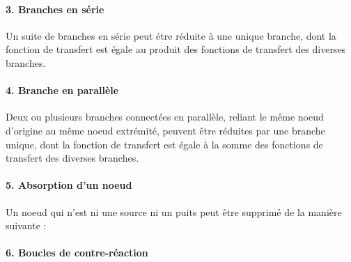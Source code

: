 \paragraph{3. Branches en série}
Un suite de branches en série peut étre réduite à une unique branche, dont la 
fonction de transfert est égale au produit des fonctions de transfert des 
diverses branches.

\begin{center}
    
\end{center}


\paragraph{4. Branche en parallèle}
Deux ou plusieurs branches connectées en parallèle, reliant le même noeud 
d'origine au même noeud extrémité, peuvent être réduites par une branche 
unique, dont la fonction de transfert est égale à la somme des fonctions de 
transfert des diverses branches. 

\begin{center}
    
\end{center}

\paragraph{5. Absorption d'un noeud}
Un noeud qui n'est ni une source ni un puits peut être supprimé de la
manière suivante :

\begin{center}
    
\end{center}

\paragraph{6. Boucles de contre-réaction}

